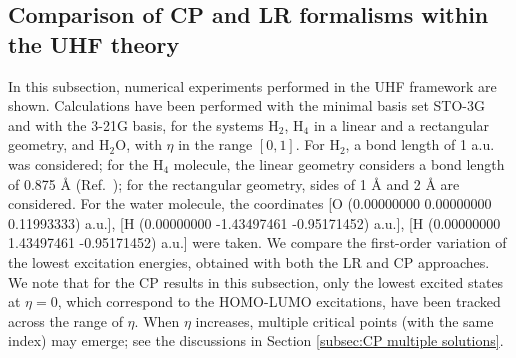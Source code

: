 \documentclass[11pt]{article}
\begin{document}
\subsection{Comparison of CP and LR formalisms within the UHF theory}\label{subsec:CP LR compare}
In this subsection, numerical experiments performed in the UHF framework are shown. Calculations have been performed with the minimal basis set STO-3G\supercite{hehre1969a} and with the 3-21G basis,\supercite{binkley1980a} for the systems H$_2$, H$_4$ in a linear and a rectangular geometry, and H$_2$O, with $\eta$ in the range $[0,1]$. For H$_2$, a bond length of 1 a.u. was considered; for the H$_4$ molecule, the linear geometry considers a bond length of 0.875 {\AA} (Ref.~\cite{burton2020energy}); for the rectangular geometry, sides of 1 {\AA} and 2 {\AA} are considered. For the water molecule, the coordinates [O (0.00000000     0.00000000     0.11993333) a.u.], [H (0.00000000    -1.43497461    -0.95171452) a.u.], [H (0.00000000     1.43497461    -0.95171452) a.u.] were taken. 
We compare the first-order variation of the lowest excitation energies, obtained with both the LR and CP approaches.
We note that for the CP results in this subsection, only the lowest excited states at $\eta=0$, which correspond to the HOMO-LUMO excitations, have been tracked across the range of $\eta$. When $\eta$ increases, multiple critical points (with the same index) may emerge; see the discussions in Section \ref{subsec:CP multiple solutions}. 
\end{document}
